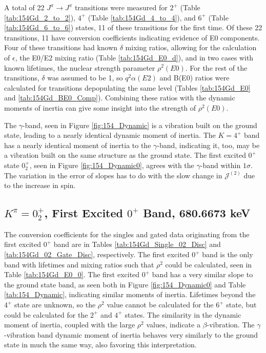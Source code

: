 A total of 22 $J^{\pi}\rightarrow J^{\pi}$ transitions were measured for $2^+$ (Table \ref{tab:154Gd_2_to_2}), $4^+$ (Table \ref{tab:154Gd_4_to_4}), and $6^+$ (Table \ref{tab:154Gd_6_to_6}) states, 11 of these transitions for the first time. Of these 22 transitions, 11 have conversion coefficients indicating evidence of E0 components. Four of these transitions had known $\delta$ mixing ratios, allowing for the calculation of $\epsilon$, the E0/E2 mixing ratio (Table \ref{tab:154Gd_E0_d}), and in two cases with known lifetimes, the nuclear strength parameter $\rho^2(E0)$. For the rest of the transitions, $\delta$ was assumed to be 1, so $q^2\alpha(E2)$ and B(E0) ratios were calculated for transitions depopulating the same level (Tables \ref{tab:154Gd_E0} and \ref{tab:154Gd_BE0_Comp}). Combining these ratios with the dynamic moments of inertia can give some insight into the strength of $\rho^2(E0)$.







The $\gamma$-band, seen in Figure \ref{fig:154_Dynamic} is a vibration built on the ground state, leading to a nearly identical dynamic moment of inertia. The $K=4^+$ band has a nearly identical moment of inertia to the $\gamma$-band, indicating it, too, may be a vibration built on the same structure as the ground state. The first excited $0^+$ state $0^+_2$, seen in Figure \ref{fig:154_Dynamic0}, agrees with the $\gamma$-band within $1\sigma$. The variation in the error of slopes has to do with the slow change in $\mathcal{J}^{(2)}$ due to the increase in spin. 

\subsection{$K^{\pi}=0^+_2$, First Excited $0^+$ Band, 680.6673 keV}

The conversion coefficients for the singles and gated data originating from the first excited $0^+$ band are in Tables \ref{tab:154Gd_Single_02_Disc} and \ref{tab:154Gd_02_Gate_Disc}, respectively. The first excited $0^+$ band is the only band with lifetimes and mixing ratios such that $\rho^2$ could be calculated, seen in Table \ref{tab:154Gd_E0_0}. The first excited $0^+$ band has a very similar slope to the ground state band, as seen both in Figure \ref{fig:154_Dynamic0} and Table \ref{tab:154_Dynamic}, indicating similar moments of inertia. Lifetimes beyond the $4^+$ state are unknown, so the $\rho^2$ value cannot be calculated for the $6^+$ state, but could be calculated for the $2^+$ and $4^+$ states. The similarity in the dynamic moment of inertia, coupled with the large $\rho^2$ values, indicate a $\beta$-vibration. The $\gamma$-vibration band dynamic moment of inertia behaves very similarly to the ground state in much the same way, also favoring this interpretation. 

